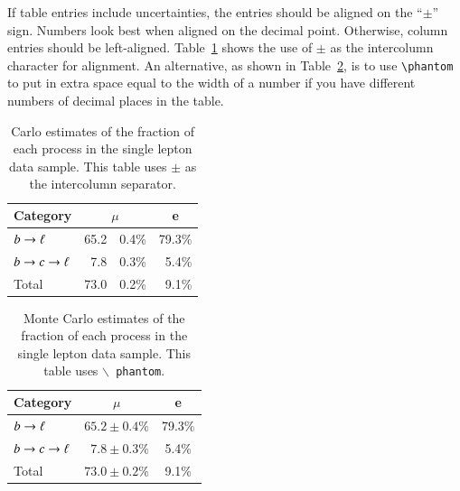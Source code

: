 \documentclass[11pt,a4paper]{atlasnote}
\newcommand{\pho}{\phantom{0}}
\newcommand{\bslash}{\ensuremath{\backslash}}
\begin{document}
If table entries include uncertainties, the entries should be aligned
on the ``$\pm$'' sign. Numbers look best when aligned on the decimal
point. Otherwise, column entries should be left-aligned.
Table~\ref{tab:example1} shows the use of $\pm$ as the intercolumn
character for alignment. An alternative, as shown in
Table~\ref{tab:example2}, is to use \verb+\phantom+ to put in extra
space equal to the width of a number if you have different numbers of
decimal places in the table.


\begin{table}
  \begin{center}
    \begin{tabular}{lr@{$\pm$}lr}
      \hline \hline
      Category      & \multicolumn{2}{c}{$\mu$}&\multicolumn{1}{c}{e}\\ 
      \hline
      $b \rightarrow \ell $       &     65.2 & 0.4\%   &  79.3\% \\
      $b \rightarrow c \rightarrow \ell$     &      7.8 & 0.3\%   &   5.4\% \\
      Total          &     73.0 & 0.2\%   &   9.1\% \\ 
      \hline \hline
    \end{tabular}
  \caption[Monte Carlo purities in the single lepton sample]{%
    Carlo estimates of the fraction of each process in the single
    lepton data sample. This table uses {\tt $\pm$} as the intercolumn
    separator.}
  \label{tab:example1}
  \end{center}
\end{table}


\begin{table}
  \begin{center}
    \begin{tabular}{lcc}
      \hline \hline
      Category      & \multicolumn{1}{c}{$\mu$}&\multicolumn{1}{c}{e}\\ 
      \hline
      $b \rightarrow \ell $       & $    65.2 \pm 0.4\%$   &     79.3\% \\
      $b \rightarrow c \rightarrow \ell$     & $\pho 7.8 \pm 0.3\%$   & \pho 5.4\% \\
      Total          & $    73.0 \pm 0.2\%$   & \pho 9.1\% \\ 
      \hline \hline
    \end{tabular}
  \caption{Monte Carlo estimates of the fraction of each process in
    the single lepton data sample. This table uses {\tt \bslash
    phantom}.}
  \label{tab:example2}
  \end{center}
\end{table}
\end{document}

